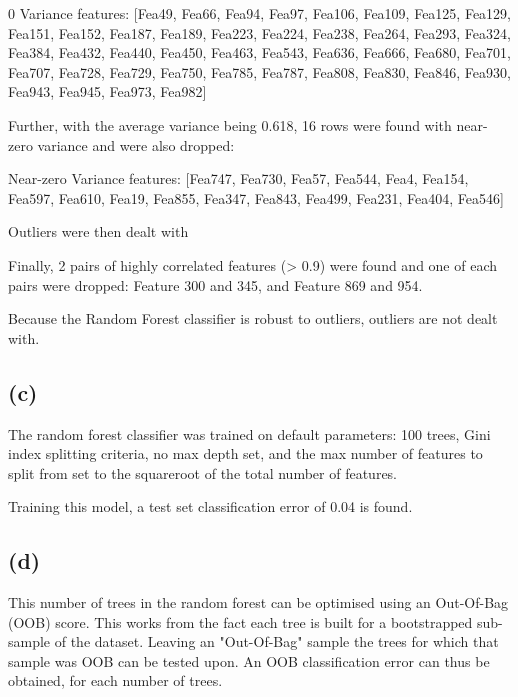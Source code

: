 \documentclass[12pt]{report} %
\begin{document}
\begin{center}
    0 Variance features: [Fea49, Fea66, Fea94, Fea97, Fea106, Fea109, Fea125, Fea129, Fea151, Fea152, Fea187, Fea189, Fea223, Fea224, Fea238, Fea264, Fea293, Fea324, Fea384, Fea432, Fea440, Fea450, Fea463, Fea543, Fea636, Fea666, Fea680, Fea701, Fea707, Fea728, Fea729, Fea750, Fea785, Fea787, Fea808, Fea830, Fea846, Fea930, Fea943, Fea945, Fea973, Fea982]
\end{center}

Further, with the average variance being 0.618, 16 rows were found with near-zero variance and were also dropped:

\begin{center}
    Near-zero Variance features: [Fea747, Fea730, Fea57, Fea544, Fea4, Fea154, Fea597, Fea610, Fea19, Fea855, Fea347, Fea843, Fea499, Fea231, Fea404, Fea546]
\end{center}

Outliers were then dealt with

Finally, 2 pairs of highly correlated features (> 0.9) were found and one of each pairs were dropped: Feature 300 and 345, and Feature 869 and 954.

Because the Random Forest classifier is robust to outliers, outliers are not dealt with\cite[pp. 346-347]{james2013introduction}.


\subsection*{(c)}

The random forest classifier was trained on default parameters: 100 trees, Gini index splitting criteria, no max depth set, and the max number of features to split from set to the squareroot of the total number of features.  

Training this model, a test set classification error of 0.04 is found.

\subsection*{(d)}

This number of trees in the random forest can be optimised using an Out-Of-Bag (OOB) score. This works from the fact each tree is built for a bootstrapped sub-sample of the dataset. Leaving an "Out-Of-Bag" sample the trees for which that sample was OOB can be tested upon. An OOB classification error can thus be obtained, for each number of trees\cite[p. 345]{james2013introduction}.  
\end{document}
